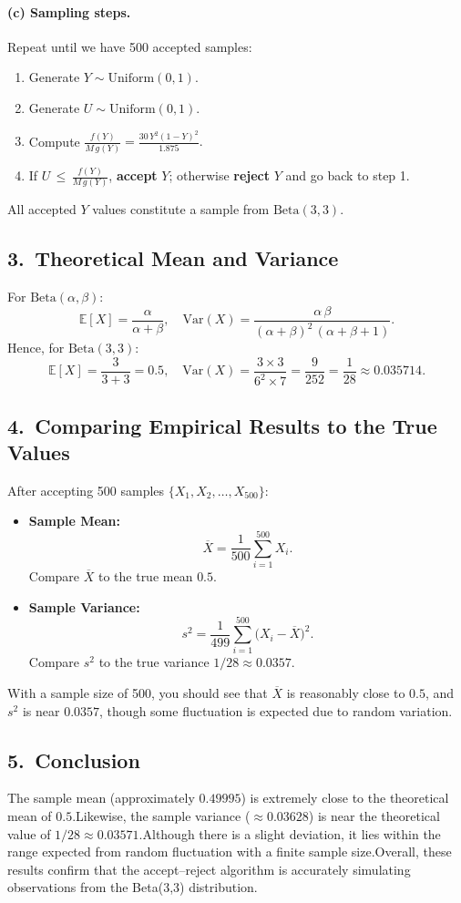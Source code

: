 \documentclass[final,11pt]{article}
\begin{document}
\begin{spacing}{1.25}
{\paragraph{(c) Sampling steps.}
Repeat until we have 500 accepted samples:
\begin{enumerate}
 \item Generate $Y \sim \mathrm{Uniform}(0,1)$.
 \item Generate $U \sim \mathrm{Uniform}(0,1)$.
 \item Compute $\displaystyle \frac{f(Y)}{M\,g(Y)} 
 = \frac{30\,Y^2(1-Y)^2}{1.875}.$
 \item If $U \,\le\, \tfrac{f(Y)}{M\,g(Y)}$, \textbf{accept} $Y$; otherwise \textbf{reject} $Y$ and go back to step 1.
\end{enumerate}
All accepted $Y$ values constitute a sample from $\mathrm{Beta}(3,3)$.

\subsection*{3.\, Theoretical Mean and Variance}
For $\mathrm{Beta}(\alpha,\beta)$:
\[
\mathbb{E}[X] 
= \frac{\alpha}{\alpha+\beta},
\quad
\mathrm{Var}(X)
= \frac{\alpha\,\beta}{(\alpha+\beta)^2\,(\alpha+\beta+1)}.
\]
Hence, for $\mathrm{Beta}(3,3)$:
\[
\mathbb{E}[X] 
= \frac{3}{3+3}
= 0.5,
\quad
\mathrm{Var}(X) 
= \frac{3\times 3}{6^2 \times 7}
= \frac{9}{252}
= \frac{1}{28}
\approx 0.035714.
\]

\subsection*{4.\, Comparing Empirical Results to the True Values}
After accepting 500 samples $\{X_1,X_2,\ldots,X_{500}\}$:
\begin{itemize}
 \item \textbf{Sample Mean:} 
 \[
   \overline{X} = \frac{1}{500} \sum_{i=1}^{500} X_i.
 \]
   Compare $\overline{X}$ to the true mean $0.5$.
 \item \textbf{Sample Variance:} 
 \[
   s^2 = \frac{1}{499} \sum_{i=1}^{500} \bigl(X_i - \overline{X}\bigr)^2.
 \]
   Compare $s^2$ to the true variance $1/28 \approx 0.0357$.
\end{itemize}
With a sample size of 500, you should see that $\overline{X}$ is reasonably close to $0.5$, and $s^2$ is near $0.0357$, though some fluctuation is expected due to random variation.

\subsection*{5.\, Conclusion}
The sample mean (approximately $0.49995$) is extremely close to the theoretical mean of $0.5$.Likewise, the sample variance ($\approx 0.03628$) is near the theoretical value of $1/28 \approx 0.03571$.Although there is a slight deviation, it lies within the range expected from random fluctuation with a finite sample size.Overall, these results confirm that the accept--reject algorithm is accurately simulating observations from the Beta(3,3) distribution.

}


\end{spacing}
\end{document}
